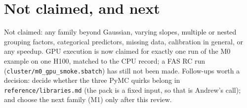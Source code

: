 \documentclass[11pt]{article}
\newcommand{\file}[1]{\texttt{#1}}
\begin{document}
\section{Not claimed, and next}

Not claimed: any family beyond Gaussian, varying slopes, multiple or nested grouping
factors, categorical predictors, missing data, calibration in general, or any speedup. GPU
execution is now claimed for exactly one run of the M0 example on one H100, matched to the
CPU record; a FAS RC run (\file{cluster/m0\_gpu\_smoke.sbatch}) has still not been made.
Follow-ups worth a decision: decide whether the three PyMC quirks belong in
\file{reference/libraries.md} (the pack is a fixed input, so that is Andrew's call); and
choose the next family (M1) only after this review.
\end{document}
